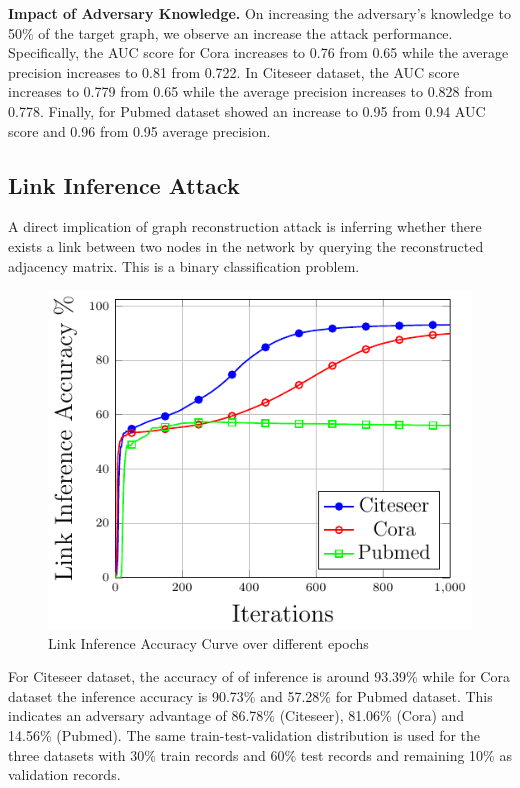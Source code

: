 \noindent\textbf{Impact of Adversary Knowledge.} On increasing the adversary's knowledge to 50\% of the target graph, we observe an increase the attack performance.
Specifically, the AUC score for Cora increases to 0.76 from 0.65 while the average precision increases to 0.81 from 0.722.
In Citeseer dataset, the AUC score increases to 0.779 from 0.65 while the average precision increases to 0.828 from 0.778.
Finally, for Pubmed dataset showed an increase to 0.95 from 0.94 AUC score and 0.96 from 0.95 average precision.



\subsection{Link Inference Attack}

A direct implication of graph reconstruction attack is inferring whether there exists a link between two nodes in the network by querying the reconstructed adjacency matrix.
This is a binary classification problem.

\begin{figure}[!htb]
  \begin{center}
    \includegraphics[width=0.65\linewidth]{figures/LinkInfer/LinkInfer.pdf}
  \end{center}
  \caption{Link Inference Accuracy Curve over different epochs}
\end{figure}

\noindent For Citeseer dataset, the accuracy of of inference is around 93.39\% while for Cora dataset the inference accuracy is 90.73\% and 57.28\% for Pubmed dataset.
This indicates an adversary advantage of 86.78\% (Citeseer), 81.06\% (Cora) and 14.56\% (Pubmed).
The same train-test-validation distribution is used for the three datasets with 30\% train records and 60\% test records and remaining 10\% as validation records.



